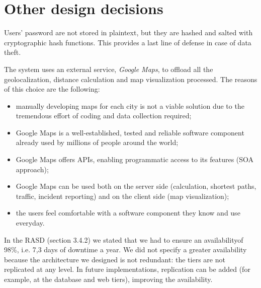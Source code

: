 \section{Other design decisions}
\label{sec:other-design-decisions}

Users' password are not stored in plaintext, but they are hashed and salted with cryptographic hash functions. This provides a last line of defense in case of data theft.

The system uses an external service, \emph{Google Maps}, to offload all the geolocalization, distance calculation and map visualization processed. The reasons of this choice are the following:
\begin{itemize}
    \item manually developing maps for each city is not a viable solution due to the tremendous effort of coding and data collection required;
    \item Google Maps is a well-established, tested and reliable software component already used by millions of people around the world;
    \item Google Maps offers APIs, enabling programmatic access to its features (SOA approach);
    \item Google Maps can be used both on the server side (calculation, shortest paths, traffic, incident reporting) and on the client side (map visualization);
    \item the users feel comfortable with a software component they know and use everyday.
\end{itemize}

In the RASD (section 3.4.2) we stated that we had to ensure an availabilityof 98\%, i.e. 7,3 days of downtime a year.
We did not specify a greater availability because the architecture we designed is not redundant: the tiers are not replicated at any level.
In future implementations, replication can be added (for example, at the database and web tiers), improving the availability.
